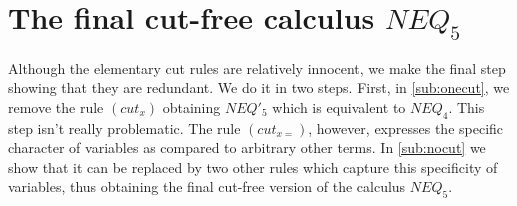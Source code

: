 \section{The final cut-free calculus $NEQ_5$}\label{se:lastNEQ}
Although the elementary cut rules
are relatively innocent,
we make the final step showing that they are redundant. 
We do it in two steps. First, in \ref{sub:onecut}, we remove the rule $(cut_x)$ 
obtaining $NEQ'_5$ which is equivalent to $NEQ_4$.
This step isn't really problematic.
The rule $(cut_{x=})$, however, expresses the specific character of variables as
compared to arbitrary other terms. In \ref{sub:nocut} we show that it can be
replaced by two other rules which capture this specificity of variables, thus
obtaining the final cut-free version of the calculus $NEQ_5$.

%
